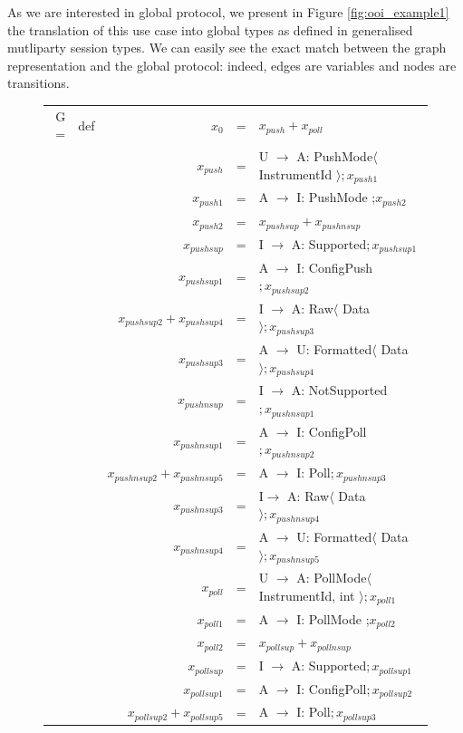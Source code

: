 \documentclass{article}
\begin{document}
As we are interested in global protocol, we present in Figure \ref{fig:ooi_example1} the translation of this use case into global types as defined in generalised mutliparty session types. We can easily see the exact match between the graph representation and the global protocol: indeed, edges are variables and nodes are transitions.\\
\begin{figure}[h]
\begin{tabular}{rcrcl}
G =& def & $x_{0}$ &=& $x_{push} + x_{poll}$\\
&& $x_{push}$ &=& U $\rightarrow$ A: PushMode$\langle$ InstrumentId $\rangle ; x_{push1}$\\
&& $x_{push1}$ &=& A $\rightarrow$ I: PushMode ;$ x_{push2}$\\
&& $x_{push2}$ &=& $ x_{pushsup} + x_{pushnsup}$\\
&& $x_{pushsup}$ &=& I $\rightarrow$ A: Supported$ ; x_{pushsup1}$\\
&& $x_{pushsup1}$ &=& A $\rightarrow$ I: ConfigPush$ ; x_{pushsup2}$\\
&& $x_{pushsup2} + x_{pushsup4}$ &=& I $\rightarrow$ A: Raw$\langle$ Data $\rangle ; x_{pushsup3}$\\
&& $x_{pushsup3}$ &=& A $\rightarrow$ U: Formatted$\langle$ Data $\rangle ; x_{pushsup4}$\\
&& $x_{pushnsup}$ &=& I $\rightarrow$ A: NotSupported$ ; x_{pushnsup1}$\\
&& $x_{pushnsup1}$ &=& A $\rightarrow$ I: ConfigPoll$ ; x_{pushnsup2}$\\
&& $x_{pushnsup2} + x_{pushnsup5}$ &=& A $\rightarrow$ I: Poll$ ; x_{pushnsup3}$\\
&& $x_{pushnsup3}$ &= & I$\rightarrow$ A: Raw$\langle$ Data $\rangle ; x_{pushnsup4}$\\
&& $x_{pushnsup4}$ &=& A $\rightarrow$ U: Formatted$\langle$ Data $\rangle ; x_{pushnsup5}$\\
&& $x_{poll}$ &=& U $\rightarrow$ A: PollMode$\langle$ InstrumentId, int $\rangle ; x_{poll1}$\\
&& $x_{poll1}$ &=& A $\rightarrow$ I: PollMode ;$ x_{poll2}$\\
&& $x_{poll2}$ &=& $ x_{pollsup} + x_{pollnsup}$\\
&& $x_{pollsup}$ &=& I $\rightarrow$ A: Supported$ ; x_{pollsup1}$\\
&& $x_{pollsup1}$ &=& A $\rightarrow$ I: ConfigPoll$ ; x_{pollsup2}$\\
&& $x_{pollsup2} + x_{pollsup5}$ &=& A $\rightarrow$ I: Poll$ ; x_{pollsup3}$\\

\end{tabular}
\end{figure}
\end{document}
